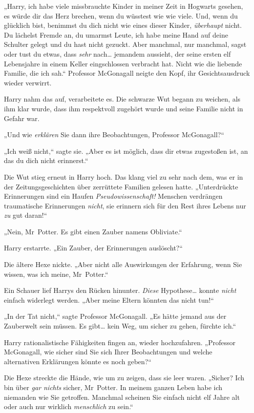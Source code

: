 {„Harry, ich habe viele missbrauchte Kinder in meiner Zeit in Hogwarts gesehen, es würde dir das Herz brechen, wenn du wüsstest wie wie viele. Und, wenn du glücklich bist, benimmst du dich nicht wie eines dieser Kinder, \emph{überhaupt} nicht. Du lächelst Fremde an, du umarmst Leute, ich habe meine Hand auf deine Schulter gelegt und du hast nicht gezuckt. Aber manchmal, nur manchmal, sagst oder tust du etwas, dass \emph{sehr} nach… jemandem aussieht, der seine ersten elf Lebensjahre in einem Keller eingschlossen verbracht hat. Nicht wie die liebende Familie, die ich sah.“ Professor McGonagall neigte den Kopf, ihr Gesichtsausdruck wieder verwirrt.

Harry nahm das auf, verarbeitete es. Die schwarze Wut begann zu weichen, als ihm klar wurde, dass ihm respektvoll zugehört wurde und seine Familie nicht in Gefahr war.

„Und wie \emph{erklären} Sie dann ihre Beobachtungen, Professor McGonagall?“

„Ich weiß nicht,“ sagte sie. „Aber es ist möglich, dass dir etwas zugestoßen ist, an das du dich nicht erinnerst.“

Die Wut stieg erneut in Harry hoch. Das klang viel zu sehr nach dem, was er in der Zeitungsgeschichten über zerrüttete Familien gelesen hatte. „Unterdrückte Erinnerungen sind ein Haufen \emph{Pseudowissenschaft!} Menschen verdrängen traumatische Erinnerungen \emph{nicht}, sie erinnern sich für den Rest ihres Lebens nur \emph{zu} gut daran!“

„Nein, Mr~Potter. Es gibt einen Zauber namens Obliviate.“

Harry erstarrte. „Ein Zauber, der Erinnerungen auslöscht?“

Die ältere Hexe nickte. „Aber nicht alle Auswirkungen der Erfahrung, wenn Sie wissen, was ich meine, Mr~Potter.“

Ein Schauer lief Harrys den Rücken hinunter. \emph{Diese} Hypothese… konnte \emph{nicht} einfach widerlegt werden. „Aber meine Eltern könnten das nicht tun!“

„In der Tat nicht,“ sagte Professor McGonagall. „Es hätte jemand aus der Zauberwelt sein müssen. Es gibt… kein Weg, um sicher zu gehen, fürchte ich.“

Harry rationalistische Fähigkeiten fingen an, wieder hochzufahren. „Professor McGonagall, wie sicher sind Sie sich Ihrer Beobachtungen und welche alternativen Erklärungen könnte es noch geben?“

Die Hexe streckte die Hände, wie um zu zeigen, dass sie leer waren. „Sicher? Ich bin über \emph{gar nichts} sicher, Mr~Potter. In meinem ganzen Leben habe ich niemanden wie Sie getroffen. Manchmal scheinen Sie einfach nicht elf Jahre alt oder auch nur wirklich \emph{menschlich} zu sein.“

}
